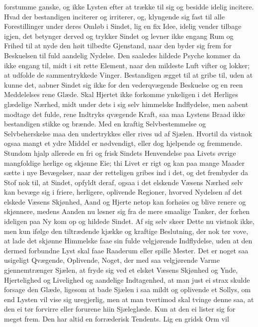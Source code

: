 \documentclass[12pt,a4paper]{book}
\newcommand{\apage}[1]{\marginnote{\footnotesize\textit{[#1]}}}
\begin{document}
forstumme ganske, og ikke Lysten efter at trække til sig og besidde
idelig incitere. Hvad der bestandigen inciterer og irriterer, og,
klyngende sig fast til alle Forestillinger under deres Omløb i Sindet,
lig en fix Idee, idelig vender tilbage igjen, det betynger derved og
trykker Sindet og levner ikke engang Rum og Frihed til at nyde den høit
tilbedte Gjenstand, naar den byder sig frem for Beskuelsen til fuld
aandelig Nydelse. Den saaledes hildede Psyche kommer da ikke engang til,
midt i sit rette Element, naar \apage{159} den mildeste Luft vifter og lokker; at
udfolde de sammentrykkede Vinger. Bestandigen ægget til at gribe til,
uden at kunne det, aabner Sindet sig ikke for den vederqvægende Beskuelse
og en reen Meddelelses rene Glæde. Skal Hjertet ikke forkomme ynkeligen i
det Herliges glædelige Nærhed, midt under dets i sig selv himmelske
Indflydelse, men aabent modtage det fulde, rene Indtryks qvægende Kraft,
saa maa Lystens Braad ikke bestandigen stikke og brænde. Med en kraftig
Selvbestemmelse og Selvbeherskelse maa den undertrykkes eller rives ud af
Sjælen. Hvortil da vistnok ogsaa mangt et ydre Middel er nødvendigt,
eller dog hjelpende og fremmende. Stundom hjalp allerede en fri og frisk
Sindets Henvendelse paa Livets øvrige mangfoldige herlige og skjønne Eie;
thi Livet er rigt og kan paa mange Maader sætte i nye Bevægelser, naar
der retteligen gribes ind i det, og det frembyder da Stof nok til, at
Sindet, opfyldt deraf, ogsaa i det elskende Væsens Nærhed selv kan bevæge
sig i friere, herligere, oplivende Regioner, hvorved Nydelsen af det
elskede Væsens Skjønhed, Aand og Hjerte netop kan forhøies og blive
renere og skjønnere, medens Aanden nu løsner sig fra de mere smaalige
Tanker, der forhen ideligen paa Ny kom op og hildede Sindet. Af sig selv
skeer Dette nu vistnok ikke, men kun ifølge den tiltrædende kjække og
kraftige Beslutning, der nok tør vove, at lade det skjønne Himmelske faae
sin fulde velgjørende Indflydelse, uden at den dermed forbundne Lyst skal
faae Raaderum eller
\apage{160} spille Mester. Det er noget saa usigeligt Qvægende, Oplivende, Noget,
der med saa velgjørende Varme gjennemtrænger Sjælen, at fryde sig ved et
elsket Væsens Skjønhed og Ynde, Hjertelighed og Livelighed og aandelige
Indtagenhed, at man just ei strax skulde forsage den Glæde, ligesom at
bade Sjælen i saa mildt og oplivende et Sollys, om end Lysten vil vise
sig uregjerlig, men at man tvertimod skal tvinge denne saa, at den ei tør
forvirre eller forurene hiin Sjæleglæde. Kun at den ei lister sig for
meget frem. Den har altid en forræderisk Tendents. Lig en gridsk Orm vil
\end{document}
